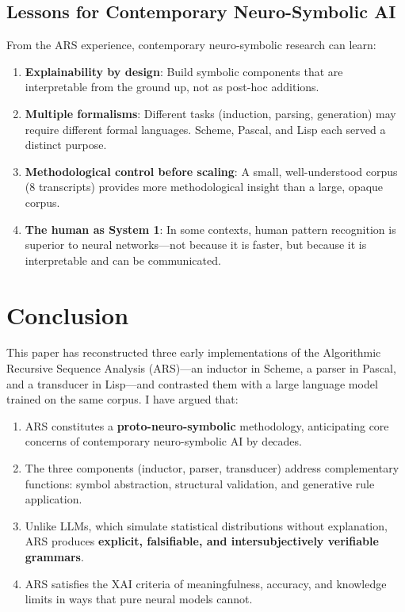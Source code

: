 \documentclass[12pt,a4paper]{article}
\begin{document}
\subsection{Lessons for Contemporary Neuro-Symbolic AI}

From the ARS experience, contemporary neuro-symbolic research can learn:

\begin{enumerate}
    \item \textbf{Explainability by design}: Build symbolic components that are 
    interpretable from the ground up, not as post-hoc additions.
    
    \item \textbf{Multiple formalisms}: Different tasks (induction, parsing, 
    generation) may require different formal languages. Scheme, Pascal, and 
    Lisp each served a distinct purpose.
    
    \item \textbf{Methodological control before scaling}: A small, 
    well-understood corpus (8 transcripts) provides more methodological insight 
    than a large, opaque corpus.
    
    \item \textbf{The human as System 1}: In some contexts, human pattern 
    recognition is superior to neural networks—not because it is faster, but 
    because it is interpretable and can be communicated.
\end{enumerate}

\section{Conclusion}

This paper has reconstructed three early implementations of the Algorithmic 
Recursive Sequence Analysis (ARS)—an inductor in Scheme, a parser in Pascal, 
and a transducer in Lisp—and contrasted them with a large language model 
trained on the same corpus. I have argued that:

\begin{enumerate}
    \item ARS constitutes a \textbf{proto-neuro-symbolic} methodology, 
    anticipating core concerns of contemporary neuro-symbolic AI by decades.
    
    \item The three components (inductor, parser, transducer) address 
    complementary functions: symbol abstraction, structural validation, and 
    generative rule application.
    
    \item Unlike LLMs, which simulate statistical distributions without 
    explanation, ARS produces \textbf{explicit, falsifiable, and intersubjectively 
    verifiable grammars}.
    
    \item ARS satisfies the XAI criteria of meaningfulness, accuracy, and 
    knowledge limits in ways that pure neural models cannot.
\end{enumerate}
\end{document}
